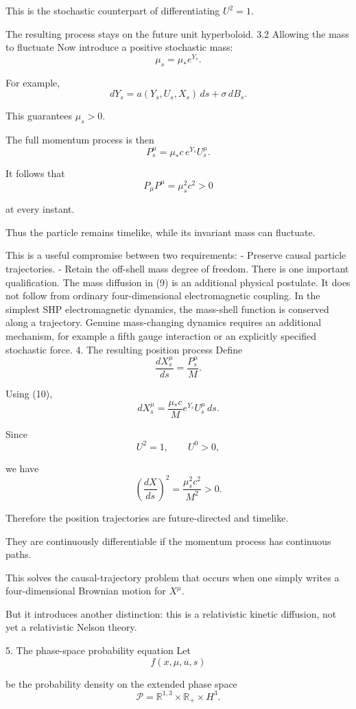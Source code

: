 This is the stochastic counterpart of differentiating \(U^2=1\).

The resulting process stays on the future unit hyperboloid.
3.2 Allowing the mass to fluctuate
Now introduce a positive stochastic mass:
\[
\mu_s=\mu_*e^{Y_s}.
\]

For example,
\[
dY_s=a(Y_s,U_s,X_s)\,ds+\sigma\,dB_s.
\tag{9}
\]

This guarantees \(\mu_s>0\).

The full momentum process is then
\[
P^\mu_s=\mu_*c\,e^{Y_s}U^\mu_s.
\tag{10}
\]

It follows that
\[
P_\mu P^\mu=\mu_s^2c^2>0
\]

at every instant.

Thus the particle remains timelike, while its invariant mass can fluctuate.

This is a useful compromise between two requirements:
- Preserve causal particle trajectories.
- Retain the off-shell mass degree of freedom.
There is one important qualification. The mass diffusion in (9) is an additional physical postulate. It does not follow from ordinary four-dimensional electromagnetic coupling. In the simplest SHP electromagnetic dynamics, the mass-shell function is conserved along a trajectory. Genuine mass-changing dynamics requires an additional mechanism, for example a fifth gauge interaction or an explicitly specified stochastic force.
4. The resulting position process
Define
\[
\frac{dX^\mu_s}{ds}
=
\frac{P^\mu_s}{M}.
\]

Using (10),
\[
\boxed{
dX^\mu_s=
\frac{\mu_*c}{M}e^{Y_s}U^\mu_s\,ds.
}
\tag{11}
\]

Since
\[
U^2=1,\qquad U^0>0,
\]

we have
\[
\left(\frac{dX}{ds}\right)^2
=
\frac{\mu_s^2c^2}{M^2}>0.
\]

Therefore the position trajectories are future-directed and timelike.

They are continuously differentiable if the momentum process has continuous paths.

This solves the causal-trajectory problem that occurs when one simply writes a four-dimensional Brownian motion for \(X^\mu\).

But it introduces another distinction: this is a relativistic kinetic diffusion, not yet a relativistic Nelson theory.

5. The phase-space probability equation
Let
\[
f(x,\mu,u,s)
\]

be the probability density on the extended phase space
\[
\mathcal P=\mathbb R^{1,3}\times\mathbb R_+\times H^3.
\]

